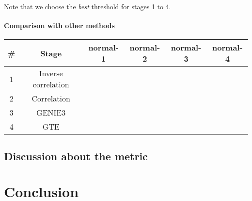 \documentclass[wcp]{jmlr}
\begin{document}
Note that we choose the \textit{best} threshold for stages 1 to 4.
\paragraph{Comparison with other methods\\}

\begin{table}[htb]
\centering
\begin{tabular}{|c|c||c|c|c|c|} \hline
\# & Stage & normal-1 & normal-2 & normal-3 & normal-4 \\ \hline
1 & Inverse correlation & & & &\\ \hline
2 & Correlation & & & &\\ \hline
3 & GENIE3 & & & & \\ \hline
4 & GTE & & & & \\ \hline

\end{tabular}
\end{table}
\subsection{Discussion about the metric}
\label{sec:metric}


\section{Conclusion}



\end{document}
